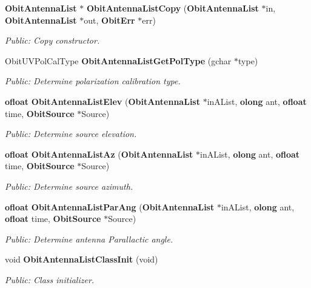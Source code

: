 \begin{CompactItemize}
{\bf Obit\-Antenna\-List} $\ast$ {\bf Obit\-Antenna\-List\-Copy} ({\bf Obit\-Antenna\-List} $\ast$in, {\bf Obit\-Antenna\-List} $\ast$out, {\bf Obit\-Err} $\ast$err)
\begin{CompactList}\small\item\em Public: Copy constructor. \item\end{CompactList}\item 
Obit\-UVPol\-Cal\-Type {\bf Obit\-Antenna\-List\-Get\-Pol\-Type} (gchar $\ast$type)
\begin{CompactList}\small\item\em Public: Determine polarization calibration type. \item\end{CompactList}\item 
{\bf ofloat} {\bf Obit\-Antenna\-List\-Elev} ({\bf Obit\-Antenna\-List} $\ast$in\-AList, {\bf olong} ant, {\bf ofloat} time, {\bf Obit\-Source} $\ast$Source)
\begin{CompactList}\small\item\em Public: Determine source elevation. \item\end{CompactList}\item 
{\bf ofloat} {\bf Obit\-Antenna\-List\-Az} ({\bf Obit\-Antenna\-List} $\ast$in\-AList, {\bf olong} ant, {\bf ofloat} time, {\bf Obit\-Source} $\ast$Source)
\begin{CompactList}\small\item\em Public: Determine source azimuth. \item\end{CompactList}\item 
{\bf ofloat} {\bf Obit\-Antenna\-List\-Par\-Ang} ({\bf Obit\-Antenna\-List} $\ast$in\-AList, {\bf olong} ant, {\bf ofloat} time, {\bf Obit\-Source} $\ast$Source)
\begin{CompactList}\small\item\em Public: Determine antenna Parallactic angle. \item\end{CompactList}\item 
void {\bf Obit\-Antenna\-List\-Class\-Init} (void)
\begin{CompactList}\small\item\em Public: Class initializer. \item\end{CompactList}\end{CompactItemize}


